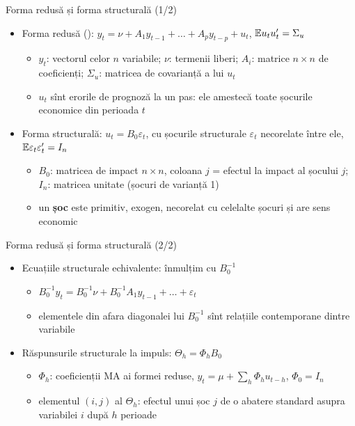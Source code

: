 \begin{frame}{Forma redusă și forma structurală (1/2)}
\itemsize{\small}
\begin{itemize}
    \item Forma redusă (): $y_t = \nu + A_1y_{t-1} + \dots + A_py_{t-p} + u_t$, $\mathbb{E} u_tu_t' = \Sigma_u$
    \begin{itemize}
        \item $y_t$: vectorul celor $n$ variabile; $\nu$: termenii liberi; $A_i$: matrice $n \times n$ de coeficienți; $\Sigma_u$: matricea de covarianță a lui $u_t$
        \item $u_t$ sînt erorile de prognoză la un pas: ele amestecă toate șocurile economice din perioada $t$
    \end{itemize}
    \item Forma structurală: $u_t = B_0\varepsilon_t$, cu șocurile structurale $\varepsilon_t$ necorelate între ele, $\mathbb{E}\varepsilon_t\varepsilon_t' = I_n$
    \begin{itemize}
        \item $B_0$: matricea de impact $n \times n$, coloana $j$ = efectul la impact al șocului $j$; $I_n$: matricea unitate (șocuri de varianță 1)
        \item un \textbf{șoc} este primitiv, exogen, necorelat cu celelalte șocuri și are sens economic 
    \end{itemize}
\end{itemize}
\end{frame}

\begin{frame}{Forma redusă și forma structurală (2/2)}
\itemsize{\small}
\begin{itemize}
    \item Ecuațiile structurale echivalente: înmulțim cu $B_0^{-1}$
    \begin{itemize}
        \item $B_0^{-1}y_t = B_0^{-1}\nu + B_0^{-1}A_1y_{t-1} + \dots + \varepsilon_t$
        \item elementele din afara diagonalei lui $B_0^{-1}$ sînt relațiile contemporane dintre variabile
    \end{itemize}
    \item Răspunsurile structurale la impuls: $\Theta_h = \Phi_hB_0$
    \begin{itemize}
        \item $\Phi_h$: coeficienții MA ai formei reduse, $y_t = \mu + \sum_h\Phi_hu_{t-h}$, $\Phi_0 = I_n$
        \item elementul $(i, j)$ al $\Theta_h$: efectul unui șoc $j$ de o abatere standard asupra variabilei $i$ după $h$ perioade
    \end{itemize}
\end{itemize}
\end{frame}


